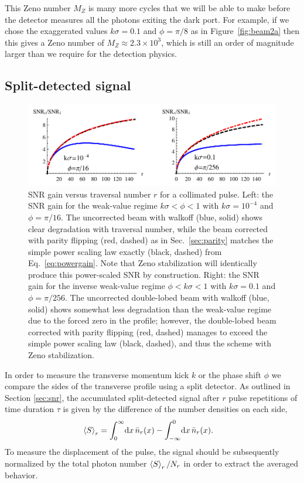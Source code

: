 This Zeno number $M_Z$ is many more cycles that we will be able to make before the detector measures all the photons exiting the dark port.  For example, if we chose the exaggerated values $k \sigma = 0.1$ and $\phi=\pi/8$ as in Figure~\ref{fig:beam2a} then this gives a Zeno number of $M_Z \approx 2.3 \times 10^3$, which is still an order of magnitude larger than we require for the detection physics.


\subsection{Split-detected signal}
\begin{figure}[th]
  \begin{center}
    \centerline{\includegraphics[width=6in]{PulsedRecycling/Figures/snrplot.pdf}}
  \end{center}
  \caption[Gain in SNR using recycling vs.~single pass weak value amplification.]{SNR gain versus traversal number $r$ for a collimated pulse.  Left: the SNR gain for the weak-value regime $k\sigma < \phi < 1$ with $k\sigma = 10^{-4}$ and $\phi = \pi/16$.  The uncorrected beam with walkoff (blue, solid) shows clear degradation with traversal number, while the beam corrected with parity flipping (red, dashed) as in Sec.~\ref{sec:parity} matches the simple power scaling law exactly (black, dashed) from Eq.~\eqref{eq:powergain}. Note that Zeno stabilization will identically produce this power-scaled SNR by construction.  Right: the SNR gain for the inverse weak-value regime $\phi < k\sigma < 1$ with $k\sigma = 0.1$ and $\phi = \pi/256$.  The uncorrected double-lobed beam with walkoff (blue, solid) shows somewhat less degradation than the weak-value regime due to the forced zero in the profile; however, the double-lobed beam corrected with parity flipping (red, dashed) manages to exceed the simple power scaling law (black, dashed), and thus the scheme with Zeno stabilization.}
  \label{fig:collimatedsnr}
\end{figure}

In order to measure the transverse momentum kick $k$ or the phase shift $\phi$ we compare the sides of the transverse profile using a split detector.  As outlined in Section \ref{sec:snr}, the accumulated split-detected signal after $r$ pulse repetitions of time duration $\tau$ is given by the difference of the number densities on each side,
\begin{align}
  \left\langle S \right\rangle_r &= \int_0^\infty \!\textrm{d}x\, \bar{n}_r(x) - \int_{-\infty}^0 \!\textrm{d}x\, \bar{n}_r(x).
\end{align}
To measure the displacement of the pulse, the signal should be subsequently normalized by the total photon number $\left\langle S \right\rangle_r / N_r$ in order to extract the averaged behavior.

